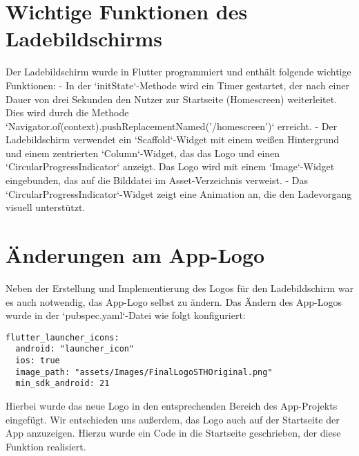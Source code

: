 \section*{Wichtige Funktionen des Ladebildschirms}
Der Ladebildschirm wurde in Flutter programmiert und enthält folgende wichtige Funktionen:
- In der `initState`-Methode wird ein Timer gestartet, der nach einer Dauer von drei Sekunden den Nutzer zur Startseite (Homescreen) weiterleitet. Dies wird durch die Methode `Navigator.of(context).pushReplacementNamed('/homescreen')` erreicht.
- Der Ladebildschirm verwendet ein `Scaffold`-Widget mit einem weißen Hintergrund und einem zentrierten `Column`-Widget, das das Logo und einen `CircularProgressIndicator` anzeigt. Das Logo wird mit einem `Image`-Widget eingebunden, das auf die Bilddatei im Asset-Verzeichnis verweist.
- Das `CircularProgressIndicator`-Widget zeigt eine Animation an, die den Ladevorgang visuell unterstützt.

\section*{Änderungen am App-Logo}
Neben der Erstellung und Implementierung des Logos für den Ladebildschirm war es auch notwendig, das App-Logo selbst zu ändern. Das Ändern des App-Logos wurde in der `pubspec.yaml`-Datei wie folgt konfiguriert:
\begin{verbatim}
flutter_launcher_icons:
  android: "launcher_icon"
  ios: true
  image_path: "assets/Images/FinalLogoSTHOriginal.png"
  min_sdk_android: 21
\end{verbatim}
Hierbei wurde das neue Logo in den entsprechenden Bereich des App-Projekts eingefügt. \newline
Wir entschieden uns außerdem, das Logo auch auf der Startseite der App anzuzeigen. Hierzu wurde ein Code in die Startseite geschrieben, der diese Funktion realisiert.
